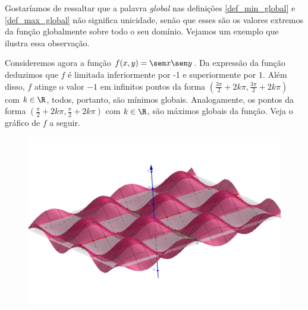Gostaríamos de ressaltar que a palavra \textit{global} nas definições  \ref{def_min_global} e \ref{def_max_global} não significa unicidade, senão que esses são os valores extremos da função globalmente sobre todo o seu domínio. Vejamos um exemplo que ilustra essa observação. 
\begin{example}{}{}
Consideremos agora a função $f(x,y)=\sen x\sen y$. 
Da expressão da função deduzimos que $f$ é limitada inferiormente por -1 e superiormente por $1$. Além disso, $f$ atinge o valor $-1$ em infinitos pontos da forma $\left(\frac{3\pi}{2}+2k\pi,\frac{3\pi}{2}+2k\pi\right)$ com $k\in\R$, todos, portanto, são mínimos globais. Analogamente, os pontos da forma $\left(\frac{\pi}{2}+2k\pi,\frac{\pi}{2}+2k\pi\right)$ com $k\in\R$, são máximos globais da função. Veja o gráfico de $f$ a seguir. 
\begin{figure}[H]
    \centering
    \includegraphics[scale=0.2]{Figuras/Semana11/seno}
    \caption{}
    \label{fig:enter-label}
\end{figure}
\end{example}

